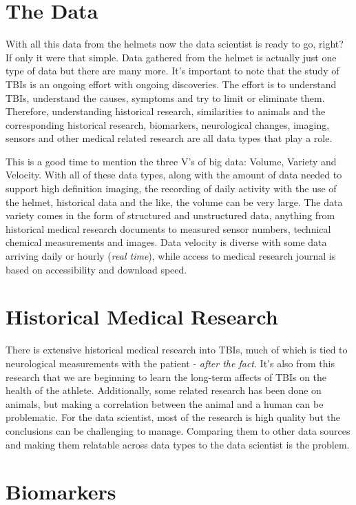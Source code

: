 \documentclass[sigconf]{acmart}
\begin{document}
\section{The Data}

With all this data from the helmets now the data scientist is ready to go, right?  If only it were that simple.  Data gathered from the helmet is actually just one type of data but there are many more.  It's important to note that the study of TBIs is an ongoing effort with ongoing discoveries.  The effort is to understand TBIs, understand the causes, symptoms and try to limit or eliminate them.  Therefore, understanding historical research, similarities to animals and the corresponding historical research, biomarkers, neurological changes, imaging, sensors and other medical related research are all data types that play a role.

This is a good time to mention the three V's of big data: Volume, Variety and Velocity.  With all of these data types, along with the amount of data needed to support high definition imaging, the recording of daily activity with the use of the helmet, historical data and the like, the volume can be very large.  The data variety comes in the form of structured and unstructured data, anything from historical medical research documents to measured sensor numbers, technical chemical measurements and images.  Data velocity is diverse with some data arriving daily or hourly ({\em real time}), while access to medical research journal is based on accessibility and download speed. 

\section{Historical Medical Research}

There is extensive historical medical research into TBIs, much of which is tied to neurological measurements with the patient - {\em after the fact}.  It's also from this research that we are beginning to learn the long-term affects of TBIs on the health of the athlete.  Additionally, some related research has been done on animals, but making a correlation between the animal and a human can be problematic.  For the data scientist, most of the research is high quality but the conclusions can be challenging to manage.  Comparing them to other data sources and making them relatable across data types to the data scientist is the problem.  

\section{Biomarkers}
\end{document}
